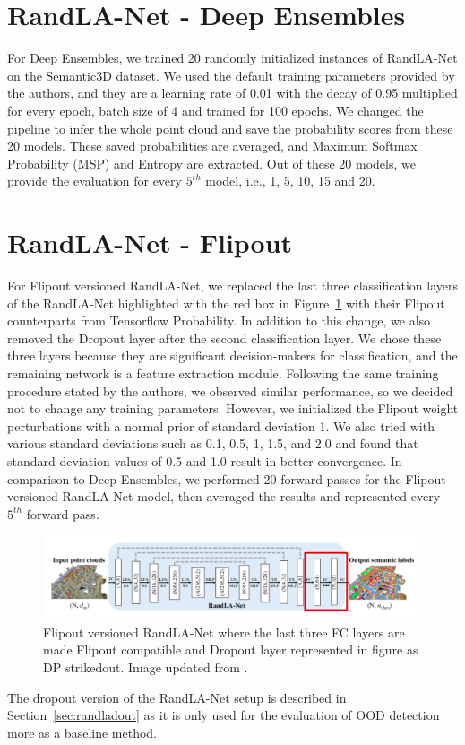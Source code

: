     \section{RandLA-Net - Deep Ensembles}
    \label{sec:de_setup}
    For Deep Ensembles, we trained 20 randomly initialized instances of RandLA-Net on the Semantic3D dataset.
    We used the default training parameters provided by the authors, and they are a learning rate of 0.01 with the decay of 0.95 multiplied for every epoch, batch size of 4 and trained for 100 epochs.
    We changed the pipeline to infer the whole point cloud and save the probability scores from these 20 models.
    These saved probabilities are averaged, and Maximum Softmax Probability (MSP) and Entropy are extracted.
    Out of these 20 models, we provide the evaluation for every $5^{th}$ model, i.e., 1, 5, 10, 15 and 20.
    \section{RandLA-Net - Flipout}
    \label{sec:flipout_setup}
    For Flipout versioned RandLA-Net, we replaced the last three classification layers of the RandLA-Net highlighted with the red box in Figure~\ref{fig:fout_randlanet} with their Flipout counterparts from Tensorflow Probability.
    In addition to this change, we also removed the Dropout layer after the second classification layer.
    We chose these three layers because they are significant decision-makers for classification, and the remaining network is a feature extraction module.
    Following the same training procedure stated by the authors, we observed similar performance, so we decided not to change any training parameters.
    However, we initialized the Flipout weight perturbations with a normal prior of standard deviation 1.
    We also tried with various standard deviations such as 0.1, 0.5, 1, 1.5, and 2.0 and found that standard deviation values of 0.5 and 1.0 result in better convergence.
    In comparison to Deep Ensembles, we performed 20 forward passes for the Flipout versioned RandLA-Net model, then averaged the results and represented every $5^{th}$ forward pass.
    \begin{figure}
        \centering
        \includegraphics[scale=0.42]{images/fout_randlanet.png}
        \caption{Flipout versioned RandLA-Net where the last three FC layers are made Flipout compatible and Dropout layer represented in figure as DP strikedout. Image updated from \cite{Hu_2020_CVPR_Randla}.}
        \label{fig:fout_randlanet}
    \end{figure}
    The dropout version of the RandLA-Net setup is described in Section~\ref{sec:randladout} as it is only used for the evaluation of OOD detection more as a baseline method.

